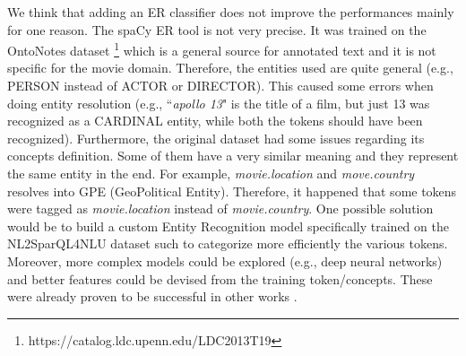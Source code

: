 \documentclass[11pt,a4paper]{article}
\begin{document}
We think that adding an ER classifier does not improve the performances mainly for one reason. The spaCy ER tool is not very precise. It was trained on the OntoNotes dataset \footnote{https://catalog.ldc.upenn.edu/LDC2013T19} which is a general source for annotated text and it is not specific for the movie domain. Therefore, the entities used are quite general (e.g., PERSON instead of ACTOR or DIRECTOR). This caused some errors when doing entity resolution (e.g., ``\textit{apollo 13}" is the title of a film, but just 13 was recognized as a CARDINAL entity, while both the tokens should have been recognized).
Furthermore, the original dataset had some issues regarding its concepts definition. Some of them have a very similar meaning and they represent the same entity in the end. For example, \textit{movie.location} and \textit{move.country} resolves into GPE (GeoPolitical Entity). Therefore, it happened that some tokens were tagged as \textit{movie.location} instead of \textit{movie.country}.  
One possible solution would be to build a custom Entity Recognition model specifically trained on the NL2SparQL4NLU dataset such to categorize more efficiently the various tokens. Moreover, more complex models could be explored (e.g., deep neural networks)  and better features could be devised from the training token/concepts. These were already proven to be successful in other works \citep{gobbi2018concept}.



\end{document}
